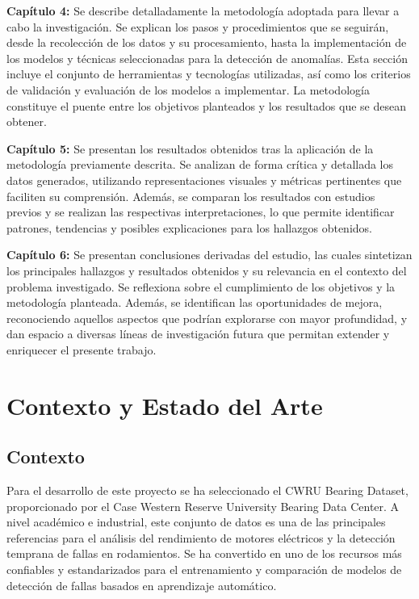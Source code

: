 \documentclass[11pt,a4paper,spanish]{book}
\numberwithin{equation}{chapter}
\numberwithin{figure}{chapter}
\begin{document}
\textbf{Capítulo 4:} Se describe detalladamente la metodología adoptada para llevar a 
cabo la investigación. 
Se explican los pasos y procedimientos que se seguirán, desde la recolección de los 
datos y su procesamiento, hasta la implementación de los modelos y técnicas 
seleccionadas para la detección de anomalías. 
Esta sección incluye el conjunto de herramientas y tecnologías utilizadas, así como los 
criterios de validación y evaluación de los modelos a implementar. 
La metodología constituye el puente entre los objetivos planteados y los resultados que
se desean obtener.


\textbf{Capítulo 5:} Se presentan los resultados obtenidos tras la aplicación de la 
metodología previamente descrita. 
Se analizan de forma crítica y detallada los datos generados, utilizando 
representaciones visuales y métricas pertinentes que faciliten su comprensión. 
Además, se comparan los resultados con estudios previos y se realizan las respectivas 
interpretaciones, lo que permite identificar patrones, tendencias y posibles 
explicaciones para los hallazgos obtenidos. 


\textbf{Capítulo 6:} Se presentan conclusiones derivadas del estudio, las cuales 
sintetizan los principales hallazgos y resultados obtenidos y su relevancia en el 
contexto del problema investigado. 
Se reflexiona sobre el cumplimiento de los objetivos y la metodología planteada. 
Además, se identifican las oportunidades de mejora, reconociendo aquellos aspectos 
que podrían explorarse con mayor profundidad, y dan espacio a diversas líneas de 
investigación futura que permitan extender y enriquecer el presente trabajo.


\chapter{Contexto y Estado del Arte}

\section{Contexto}

Para el desarrollo de este proyecto se ha seleccionado el CWRU Bearing Dataset, proporcionado por el Case Western Reserve University Bearing Data Center. A nivel académico e industrial, este conjunto de datos es una de las principales referencias para el análisis del rendimiento de motores eléctricos y la detección temprana de fallas en rodamientos. Se ha convertido en uno de los recursos más confiables y estandarizados para el entrenamiento y comparación de modelos de detección de fallas basados en aprendizaje automático.
\end{document}
